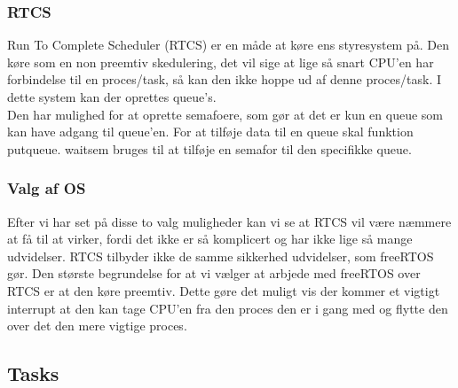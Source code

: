 \subsubsection{RTCS}

Run To Complete Scheduler (RTCS) er en måde at køre ens styresystem på. Den køre som en non preemtiv skedulering, det vil sige at lige så snart CPU'en har forbindelse til en proces/task, så kan den ikke hoppe ud af denne proces/task. I dette system kan der oprettes queue's.
\\
Den har mulighed for at oprette semafoere, som gør at det er kun en queue som kan have adgang til queue'en. For at tilføje data til en queue skal funktion put\textunderscore queue. wait\textunderscore sem bruges til at tilføje en semafor til den specifikke queue.

\subsubsection{Valg af OS}

Efter vi har set på disse to valg muligheder kan vi se at RTCS vil være næmmere at få til at virker, fordi det ikke er så komplicert og har ikke lige så mange udvidelser. RTCS tilbyder ikke de samme sikkerhed udvidelser, som freeRTOS gør. Den største begrundelse for at vi vælger at arbjede med freeRTOS over RTCS er at den køre preemtiv. Dette gøre det muligt vis der kommer et vigtigt interrupt at den kan tage CPU'en fra den proces den er i gang med og flytte den over det den mere vigtige proces.

\subsection{Tasks}

